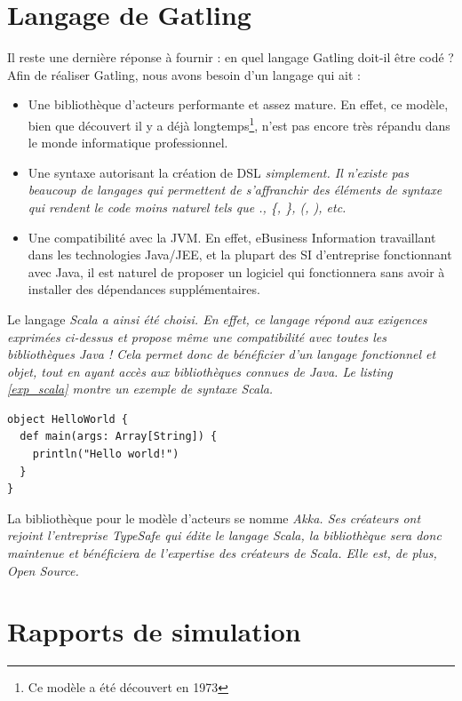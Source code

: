 \section{Langage de Gatling}
Il reste une dernière réponse à fournir : en quel langage Gatling doit-il être codé ? Afin de réaliser Gatling, nous avons besoin d'un langage qui ait :
\begin{itemize}
  \item Une bibliothèque d'acteurs performante et assez mature. En effet, ce modèle, bien que découvert il y a déjà longtemps\footnote{Ce modèle a été découvert en 1973\cite{actor_model}}, n'est pas encore très répandu dans le monde informatique professionnel.
  \item Une syntaxe autorisant la création de DSL \em{simplement}. Il n'existe pas beaucoup de langages qui permettent de s'affranchir des éléments de syntaxe qui rendent le code moins naturel tels que ., \{, \}, (, ), etc.
  \item Une compatibilité avec la JVM. En effet, eBusiness Information travaillant dans les technologies Java/JEE, et la plupart des SI d'entreprise fonctionnant avec Java, il est naturel de proposer un logiciel qui fonctionnera sans avoir à installer des dépendances supplémentaires.
\end{itemize}

Le langage \em{Scala}\cite{www_scala} a ainsi été choisi. En effet, ce langage répond aux exigences exprimées ci-dessus et propose même une compatibilité avec toutes les bibliothèques Java ! Cela permet donc de bénéficier d'un langage fonctionnel et objet, tout en ayant accès aux bibliothèques connues de Java. Le listing \ref{exp_scala} montre un exemple de syntaxe Scala.

\begin{lstlisting}[caption={Exemple de code Scala},label=exp_scala]
object HelloWorld {
  def main(args: Array[String]) {
    println("Hello world!")
  }
}
\end{lstlisting}

La bibliothèque pour le modèle d'acteurs se nomme \em{Akka}\cite{www_akka}. Ses créateurs ont rejoint l'entreprise TypeSafe qui édite le langage Scala, la bibliothèque sera donc maintenue et bénéficiera de l'expertise des créateurs de Scala. Elle est, de plus, Open Source.

\section{Rapports de simulation}
